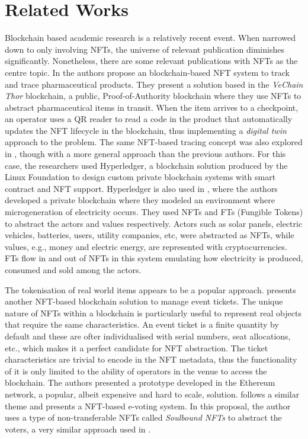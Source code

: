 \documentclass[../main.tex]{subfiles}
\begin{document}
\section{Related Works}
\label{sec:related_works}
Blockchain based academic research is a relatively recent event. When narrowed down to only involving NFTs, the universe of relevant publication diminishes significantly. Nonetheless, there are some relevant publications with NFTs as the centre topic. In \cite{Chiacchio2022} the authors propose an blockchain-based NFT system to track and trace pharmaceutical products. They present a solution based in the \textit{VeChain Thor} blockchain, a public, Proof-of-Authority blockchain where they use NFTs to abstract pharmaceutical items in transit. When the item arrives to a checkpoint, an operator uses a QR reader to read a code in the product that automatically updates the NFT lifecycle in the blockchain, thus implementing a \textit{digital twin} approach to the problem. The same NFT-based tracing concept was also explored in \cite{Bal2019}, though with a more general approach than the previous authors. For this case, the researchers used Hyperledger, a blockchain solution produced by the Linux Foundation to design custom private blockchain systems with smart contract and NFT support. Hyperledger is also used in \cite{Karandikar2021}, where the authors developed a private blockchain where they modeled an environment where microgeneration of electricity occurs. They used NFTs and FTs (Fungible Tokens) to abstract the actors and values respectively. Actors such as solar panels, electric vehicles, batteries, users, utility companies, etc, were abstracted as NFTs, while values, e.g., money and electric energy, are represented with cryptocurrencies. FTs flow in and out of NFTs in this system emulating how electricity is produced, consumed and sold among the actors.
\par
The tokenisation of real world items appears to be a popular approach. \cite{Regner2019} presents another NFT-based blockchain solution to manage event tickets. The unique nature of NFTs within a blockchain is particularly useful to represent real objects that require the same characteristics. An event ticket is a finite quantity by default and these are ofter individualised with serial numbers, seat allocations, etc., which makes it a perfect candidate for NFT abstraction. The ticket characteristics are trivial to encode in the NFT metadata, thus the functionality of it is only limited to the ability of operators in the venue to access the blockchain. The authors presented a prototype developed in the Ethereum network, a popular, albeit expensive and hard to scale, solution. \cite{Wadhwa2024} follows a similar theme and presents a NFT-based e-voting system. In this proposal, the author uses a type of non-transferable NFTs called \textit{Soulbound NFTs} to abstract the voters, a very similar approach used in \cite{Sagar2023}.
\end{document}
